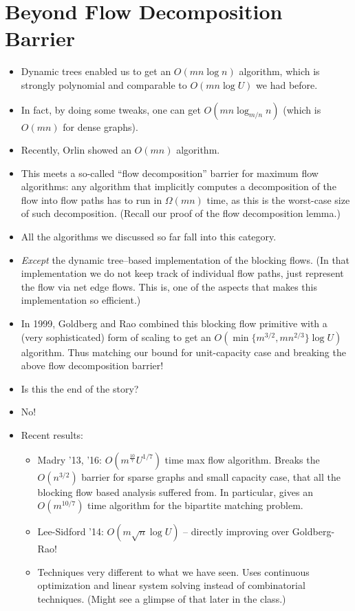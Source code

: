 \documentclass{article}
\begin{document}
\section{Beyond Flow Decomposition Barrier}

\begin{itemize}
\item Dynamic trees enabled us to get an $O(mn\log n)$ algorithm, which is strongly polynomial and comparable to $O(mn\log U)$ we had before.
\item In fact, by doing some tweaks, one can get $O(mn \log_{m/n} n)$ (which is $O(mn)$ for dense graphs). 
\item Recently, Orlin showed an $O(mn)$ algorithm.
\item This meets a so-called ``flow decomposition'' barrier for maximum flow algorithms: any algorithm that implicitly computes a decomposition of the flow into flow paths has to run in $\Omega(mn)$ time, as this is the worst-case size of such decomposition. (Recall our proof of the flow decomposition lemma.)
\item All the algorithms we discussed so far fall into this category. 
\item{\em  Except} the dynamic tree--based implementation of the blocking flows. (In that implementation we do not keep track of individual flow paths, just represent the flow via net edge flows. This is, one of the aspects that makes this implementation so efficient.)
\item In 1999, Goldberg and Rao combined this blocking flow primitive with a (very sophisticated) form of scaling to get an $O(\min\{m^{3/2}, mn^{2/3}\}\log U)$ algorithm. Thus matching our bound for unit-capacity case and breaking the above flow decomposition barrier!
\item Is this the end of the story?
\item No! 
\item Recent results:
\begin{itemize}
\item Madry '13, '16: $O(m^{\frac{10}{7}}U^{1/7})$ time max flow algorithm. Breaks the $O(n^{3/2})$ barrier for sparse graphs and small capacity case, that all the  blocking flow based analysis suffered from. In particular, gives an $O(m^{10/7})$ time algorithm for the bipartite matching problem. 
\item Lee-Sidford '14: $O(m\sqrt{n}\log U)$ -- directly improving over Goldberg-Rao!
\item Techniques very different to what we have seen. Uses continuous optimization and linear system solving instead of combinatorial techniques. (Might see a glimpse of that later in the class.)

\end{itemize}
\end{itemize}
\end{document}

